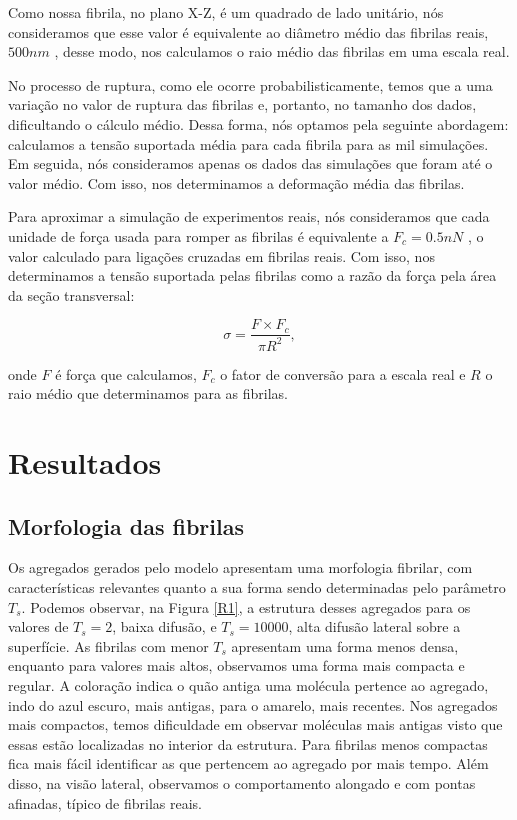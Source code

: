 \documentclass[11pt,a4paper]{article} %
\begin{document}
    Como nossa fibrila, no plano X-Z, é um quadrado de lado unitário, nós consideramos que esse valor é equivalente 
    ao diâmetro médio das fibrilas reais, \(500 nm\) \cite{KADLER1996, Parry1984}, desse modo, nos calculamos o raio médio 
    das fibrilas em uma escala real. 

    No processo de ruptura, como ele ocorre probabilisticamente, temos que a uma variação no valor de ruptura das fibrilas 
    e, portanto, no tamanho dos dados, dificultando o cálculo médio. Dessa forma, nós optamos pela seguinte abordagem: calculamos 
    a tensão suportada média para cada fibrila para as mil simulações. Em seguida, nós consideramos apenas os dados das simulações 
    que foram até o valor médio. Com isso, nos determinamos a deformação média das fibrilas.  

    Para aproximar a simulação de experimentos reais, nós consideramos que cada unidade de força usada para romper as fibrilas é 
    equivalente a \( F_{c} = 0.5 nN\) \cite{Pandolfi2019AMM}, o valor calculado para ligações cruzadas em fibrilas reais. Com isso,  
    nos determinamos a tensão suportada pelas fibrilas como a razão da força pela área da seção transversal: 


    \begin{equation} 
        \sigma = \frac{F \times F_{c}}{\pi R^{2}}, 
    \end{equation} 


    \noindent onde \(F\) é força que calculamos, \( F_{c}\) o fator de conversão para a escala real e \(R\) o raio médio que determinamos 
    para as fibrilas. 


    \section{Resultados}
        \subsection{Morfologia das fibrilas} 

     
        Os agregados gerados pelo modelo apresentam uma morfologia fibrilar, com características relevantes quanto a sua forma  
        sendo determinadas pelo parâmetro \(T_{s}\). Podemos observar, na Figura \ref{R1}, a estrutura desses agregados  
        para os valores de \(T_{s} = 2\), baixa difusão, e \(T_{s} = 10000\), alta difusão lateral sobre a superfície. As  
        fibrilas com menor \(T_{s}\) apresentam uma forma menos densa, enquanto para valores mais altos, observamos uma  
        forma mais compacta e regular. A coloração indica o quão antiga uma molécula pertence ao agregado, indo do azul  
        escuro, mais antigas, para o amarelo, mais recentes. Nos agregados mais compactos, temos dificuldade em observar  
        moléculas mais antigas visto que essas estão localizadas no interior da estrutura. Para fibrilas menos compactas fica  
        mais fácil identificar as que pertencem ao agregado por mais tempo. Além disso, na visão lateral, observamos o  
        comportamento alongado e com pontas afinadas, típico de fibrilas reais.  
\end{document}
